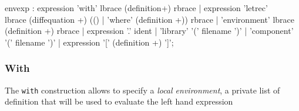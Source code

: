 
\begin{rail}
envexp :    expression 'with' lbrace (definition+) rbrace
          | expression 'letrec' \\ lbrace (diffequation +) (() | 'where' (definition +)) rbrace
          | 'environment' lbrace (definition +) rbrace
		  | expression '.' ident
          | 'library' '(' filename ')'
          | 'component' '(' filename ')'
          | expression '[' (definition +) ']';         
\end{rail}

\subsubsection{With} 
The \lstinline'with' construction allows to specify a \textit{local environment}, a private list of definition that will be used to evaluate the left hand expression


